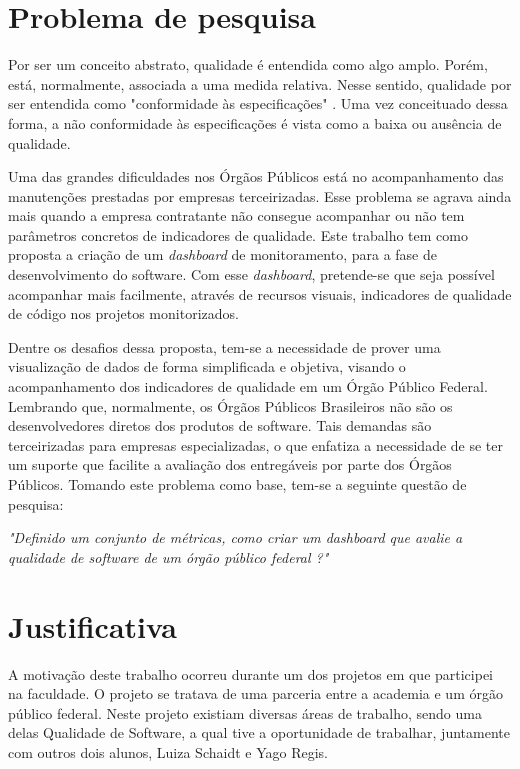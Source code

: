 \section{Problema de pesquisa}
Por ser um conceito abstrato, qualidade é entendida como algo amplo. Porém, está, normalmente, associada a uma medida relativa. Nesse sentido, qualidade por ser entendida como "conformidade às especificações" \cite{crosby}. Uma vez conceituado dessa forma, a não conformidade às especificações é vista como a baixa ou ausência de qualidade.

Uma das grandes dificuldades nos Órgãos Públicos está no acompanhamento das manutenções prestadas por empresas terceirizadas. Esse problema se agrava ainda mais quando a empresa contratante não consegue acompanhar ou não tem parâmetros concretos de indicadores de qualidade. Este trabalho tem como proposta a criação de um \textit{dashboard} de monitoramento, para a fase de desenvolvimento do software. Com esse \textit{dashboard}, pretende-se que seja possível acompanhar mais facilmente, através de recursos visuais, indicadores de qualidade de código nos projetos monitorizados.

Dentre os desafios dessa proposta, tem-se a necessidade de prover uma visualização de dados de forma simplificada e objetiva, visando o acompanhamento dos indicadores de qualidade em um Órgão Público Federal.  Lembrando que, normalmente, os Órgãos Públicos Brasileiros não são os desenvolvedores diretos dos produtos de software. Tais demandas são terceirizadas para empresas especializadas, o que enfatiza a necessidade de se ter um suporte que facilite a avaliação dos entregáveis por parte dos Órgãos Públicos. Tomando este problema como base, tem-se a seguinte questão de pesquisa:
	
	\begin{center}
	\textit{"Definido um conjunto de métricas, como criar um \textit{dashboard} que avalie a qualidade de software de um órgão público federal ?"}	
	\end{center}

\section{Justificativa}
	A motivação deste trabalho ocorreu durante um dos projetos em que participei na faculdade.  O projeto se tratava de uma parceria entre a academia e um órgão público federal. Neste projeto existiam diversas áreas de trabalho, sendo uma delas Qualidade de Software, a qual tive a oportunidade de trabalhar, juntamente com outros dois alunos, Luiza Schaidt e Yago Regis.
	
